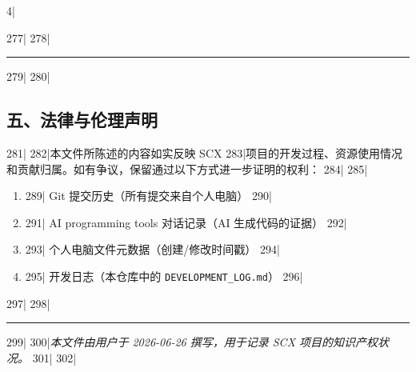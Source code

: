 4|\documentclass[
5|  12pt,
6|]{ctexart}
\begin{document}
277|
278|\begin{center}\rule{0.5\linewidth}{0.5pt}\end{center}
279|
280|\subsection{五、法律与伦理声明}\label{ux4e94ux6cd5ux5f8bux4e0eux4f26ux7406ux58f0ux660e}
281|
282|本文件所陈述的内容如实反映 SCX
283|项目的开发过程、资源使用情况和贡献归属。如有争议，保留通过以下方式进一步证明的权利：
284|
285|\begin{enumerate}
286|\def\labelenumi{\arabic{enumi}.}
287||\item
289|  Git 提交历史（所有提交来自个人电脑）
290|\item
291|  AI programming tools 对话记录（AI 生成代码的证据）
292|\item
293|  个人电脑文件元数据（创建/修改时间戳）
294|\item
295|  开发日志（本仓库中的 \texttt{DEVELOPMENT\_LOG.md}）
296|\end{enumerate}
297|
298|\begin{center}\rule{0.5\linewidth}{0.5pt}\end{center}
299|
300|\emph{本文件由用户于 2026-06-26 撰写，用于记录 SCX 项目的知识产权状况。}
301|
302|
\end{document}
